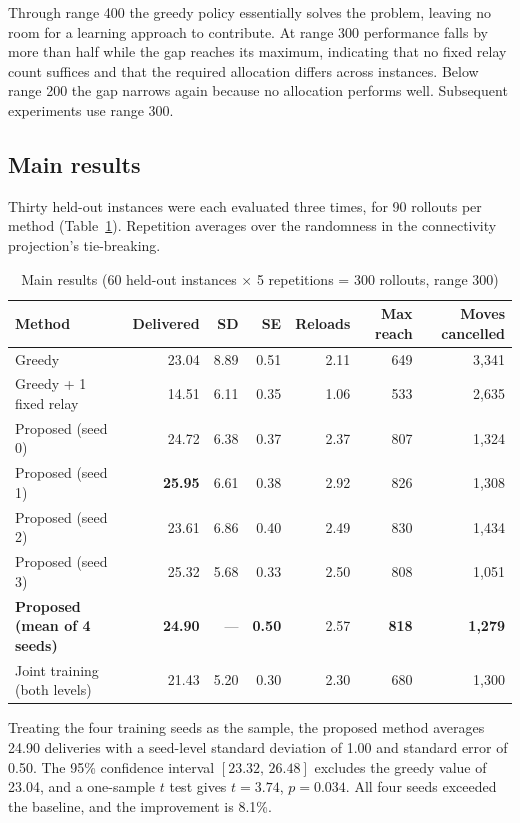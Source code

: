 \documentclass[12pt]{article}
\begin{document}
Through range 400 the greedy policy essentially solves the problem, leaving no room for a learning
approach to contribute. At range 300 performance falls by more than half while the gap reaches its
maximum, indicating that no fixed relay count suffices and that the required allocation differs
across instances. Below range 200 the gap narrows again because no allocation performs well.
Subsequent experiments use range 300.

\subsection{Main results}

Thirty held-out instances were each evaluated three times, for 90 rollouts per method
(Table~\ref{tab:main}). Repetition averages over the randomness in the connectivity projection's
tie-breaking.

\begin{table}[h]
\centering
\caption{Main results (60 held-out instances $\times$ 5 repetitions = 300 rollouts, range 300)}
\label{tab:main}
\begin{tabular}{lrrrrrr}
\toprule
Method & Delivered & SD & SE & Reloads & Max reach & Moves cancelled \\
\midrule
Greedy & 23.04 & 8.89 & 0.51 & 2.11 & 649 & 3{,}341 \\
Greedy + 1 fixed relay & 14.51 & 6.11 & 0.35 & 1.06 & 533 & 2{,}635 \\
Proposed (seed 0) & 24.72 & 6.38 & 0.37 & 2.37 & 807 & 1{,}324 \\
Proposed (seed 1) & \textbf{25.95} & 6.61 & 0.38 & 2.92 & 826 & 1{,}308 \\
Proposed (seed 2) & 23.61 & 6.86 & 0.40 & 2.49 & 830 & 1{,}434 \\
Proposed (seed 3) & 25.32 & 5.68 & 0.33 & 2.50 & 808 & 1{,}051 \\
\textbf{Proposed (mean of 4 seeds)} & \textbf{24.90} & --- & \textbf{0.50} & 2.57 & \textbf{818} &
\textbf{1{,}279} \\
Joint training (both levels) & 21.43 & 5.20 & 0.30 & 2.30 & 680 & 1{,}300 \\
\bottomrule
\end{tabular}
\end{table}

Treating the four training seeds as the sample, the proposed method averages 24.90 deliveries with
a seed-level standard deviation of 1.00 and standard error of 0.50. The 95\% confidence interval
$[23.32,\,26.48]$ excludes the greedy value of 23.04, and a one-sample $t$ test gives $t=3.74$,
$p=0.034$. All four seeds exceeded the baseline, and the improvement is 8.1\%.
\end{document}
